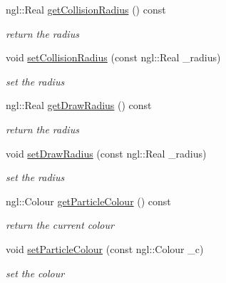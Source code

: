 \begin{DoxyCompactItemize}
ngl::Real \hyperlink{class_particle_aa036d0b56d97a9f56d9c5e3ab9035b9d}{getCollisionRadius} () const 
\begin{DoxyCompactList}\small\item\em return the radius \item\end{DoxyCompactList}\item 
void \hyperlink{class_particle_ad2926117bb4f364e653f0db90df6569c}{setCollisionRadius} (const ngl::Real \_\-radius)
\begin{DoxyCompactList}\small\item\em set the radius \item\end{DoxyCompactList}\item 
ngl::Real \hyperlink{class_particle_afeef52fff1d0ad2d8580c6245f5ef743}{getDrawRadius} () const 
\begin{DoxyCompactList}\small\item\em return the radius \item\end{DoxyCompactList}\item 
void \hyperlink{class_particle_a642d3b2a89568e2b697fabb248684c2d}{setDrawRadius} (const ngl::Real \_\-radius)
\begin{DoxyCompactList}\small\item\em set the radius \item\end{DoxyCompactList}\item 
ngl::Colour \hyperlink{class_particle_a5c4df471b87953ad02ed2674583a26e4}{getParticleColour} () const 
\begin{DoxyCompactList}\small\item\em return the current colour \item\end{DoxyCompactList}\item 
void \hyperlink{class_particle_afa5226e879eb60ca5902a733c7c365fb}{setParticleColour} (const ngl::Colour \_\-c)
\begin{DoxyCompactList}\small\item\em set the colour \item\end{DoxyCompactList}\end{DoxyCompactItemize}
